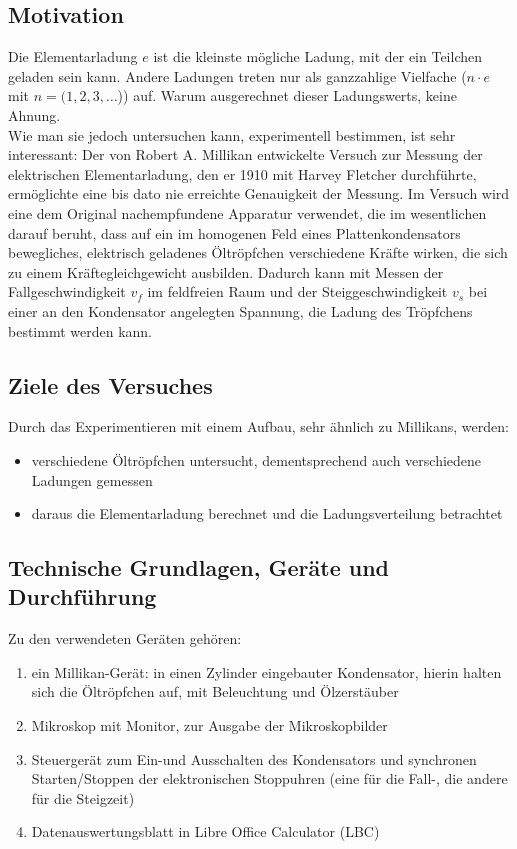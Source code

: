\subsection{Motivation}
Die Elementarladung \(e\) ist die kleinste mögliche Ladung, mit der ein Teilchen geladen sein kann. Andere Ladungen treten nur als ganzzahlige Vielfache (\(n\cdot e\) mit \(n=(1,2,3,\dots\))) auf. Warum ausgerechnet dieser Ladungswerts, keine Ahnung.\\ Wie man sie jedoch untersuchen kann, experimentell bestimmen, ist sehr interessant: Der von Robert A. Millikan entwickelte Versuch zur Messung der elektrischen Elementarladung, den er 1910 mit Harvey Fletcher durchführte, ermöglichte eine bis dato nie erreichte Genauigkeit der Messung. Im Versuch wird eine dem Original nachempfundene Apparatur verwendet, die im wesentlichen darauf beruht, dass auf ein im homogenen Feld eines Plattenkondensators bewegliches, elektrisch geladenes Öltröpfchen verschiedene Kräfte wirken, die sich zu einem Kräftegleichgewicht ausbilden. Dadurch kann mit Messen der Fallgeschwindigkeit \(v_f\) im feldfreien Raum und der Steiggeschwindigkeit \(v_s\) bei einer an den Kondensator angelegten Spannung, die Ladung des Tröpfchens bestimmt werden kann.
\subsection{Ziele des Versuches}
Durch das Experimentieren mit einem Aufbau, sehr ähnlich zu Millikans, werden:
\begin{itemize}
    \item verschiedene Öltröpfchen untersucht, dementsprechend auch verschiedene Ladungen gemessen
    \item daraus die Elementarladung berechnet und die Ladungsverteilung betrachtet
\end{itemize}

\subsection{Technische Grundlagen, Geräte und Durchführung}
Zu den verwendeten Geräten gehören:
\begin{enumerate}
    \item ein Millikan-Gerät: in einen Zylinder eingebauter Kondensator, hierin halten sich die Öltröpfchen auf, mit Beleuchtung und Ölzerstäuber
    \item Mikroskop mit Monitor, zur Ausgabe der Mikroskopbilder
    \item Steuergerät zum Ein-und Ausschalten des Kondensators und synchronen Starten/Stoppen der elektronischen Stoppuhren (eine für die Fall-, die andere für die Steigzeit)
    \item Datenauswertungsblatt in Libre Office Calculator (LBC)
\end{enumerate}\newpage
{}

